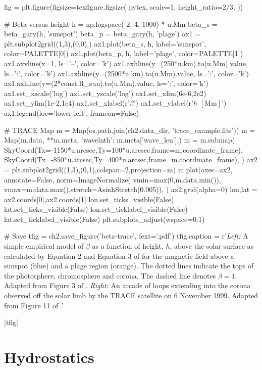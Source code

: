 \begin{pycode}[chapter2]
fig = plt.figure(figsize=texfigure.figsize(
    pytex,
    scale=1,
    height_ratio=2/3,
))

# Beta versus height
h = np.logspace(-2, 4, 1000) * u.Mm
beta_s = beta_gary(h, 'sunspot')
beta_p = beta_gary(h, 'plage')
ax1 = plt.subplot2grid((1,3),(0,0),)
ax1.plot(beta_s, h, label='sunspot', color=PALETTE[0])
ax1.plot(beta_p, h, label='plage', color=PALETTE[1])
ax1.axvline(x=1, ls='--', color='k')
ax1.axhline(y=(250*u.km).to(u.Mm).value, ls=':', color='k')
ax1.axhline(y=(2500*u.km).to(u.Mm).value, ls=':', color='k')
ax1.axhline(y=(2*const.R_sun).to(u.Mm).value, ls=':', color='k')
ax1.set_xscale('log')
ax1.set_yscale('log')
ax1.set_xlim(6e-6,2e2)
ax1.set_ylim(1e-2,1e4)
ax1.set_xlabel(r'$\beta$')
ax1.set_ylabel(r'$h$ $[\si{\mega\m}]$')
ax1.legend(loc='lower left', frameon=False)

# TRACE Map
m = Map(os.path.join(ch2.data_dir, 'trace_example.fits'))
m = Map(m.data, {**m.meta, 'wavelnth': m.meta['wave_len']},)
m = m.submap(
    SkyCoord(Tx=-1150*u.arcsec,Ty=100*u.arcsec,frame=m.coordinate_frame),
    SkyCoord(Tx=-850*u.arcsec,Ty=400*u.arcsec,frame=m.coordinate_frame),
)
ax2 = plt.subplot2grid((1,3),(0,1),colspan=2,projection=m)
m.plot(axes=ax2,
       annotate=False,
       norm=ImageNormalize(
           vmin=max(0,m.data.min()),
           vmax=m.data.max(),stretch=AsinhStretch(0.005)),
)
ax2.grid(alpha=0)
lon,lat = ax2.coords[0],ax2.coords[1]
lon.set_ticks_visible(False)
lat.set_ticks_visible(False)
lon.set_ticklabel_visible(False)
lat.set_ticklabel_visible(False)
plt.subplots_adjust(wspace=0.1)

# Save
tfig = ch2.save_figure('beta-trace', fext='.pdf')
tfig.caption = r'\textit{Left:} A simple empirical model of $\beta$ as a function of height, $h$, above the solar surface as calculated by Equation 2 and Equation 3 of \citet{gary_plasma_2001} for the magnetic field above a sunspot (blue) and a plage region (orange). The dotted lines indicate the tops of the photosphere, chromosphere and corona. The dashed line denotes $\beta=1$. Adapted from Figure 3 of \citet{gary_plasma_2001}. \textit{Right:} An arcade of loops extending into the corona observed off the solar limb by the TRACE satellite on 6 November 1999. Adapted from Figure 11 of \citet{reale_coronal_2010}.'
\end{pycode}
\py[chapter2]|tfig|

\section{Hydrostatics}\label{sec:hydrostatic}

